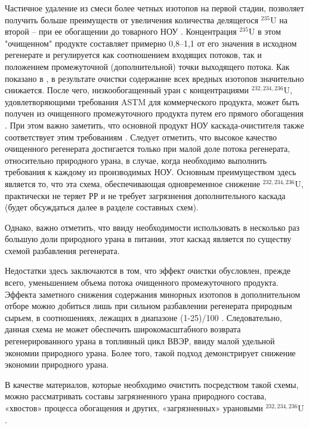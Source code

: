 Частичное удаление из смеси более четных изотопов на первой стадии, позволяет получить больше преимуществ от увеличения количества делящегося $^{235}$U на второй -- при ее обогащении до товарного НОУ \cite{palkinSeparationUraniumIsotopes2010}.
Концентрация $^{235}$U в этом "очищенном" продукте составляет примерно 0,8--1,1 от его значения в исходном регенерате и регулируется как соотношением входящих потоков, так и положением промежуточной (дополнительной) точки выходящего потока.
Как показано в \cite{palkinSeparationUraniumIsotopes2010}, в результате очистки содержание всех вредных изотопов значительно снижается. После чего, низкообогащенный уран с концентрациями $^{232,234,236}$U, удовлетворяющими требования ASTM для коммерческого продукта, может быть получен из очищенного промежуточного продукта путем его прямого обогащения \cite{shopenSposobPolucheniyaRazbavitelya2008}.
При этом важно заметить, что основной продукт НОУ каскада-очистителя также соответствует этим требованиям \cite{palkinSeparationUraniumIsotopes2010}. Следует отметить, что высокое качество очищенного регенерата достигается только при малой доле потока регенерата, относительно природного урана, в случае, когда необходимо выполнить требования к каждому из производимых НОУ.
Основным преимуществом здесь является то, что эта схема, обеспечивающая одновременное снижение $^{232,234,236}$U, практически не теряет РР и не требует загрязнения дополнительного каскада (будет обсуждаться далее в разделе составных схем).

Однако, важно отметить, что ввиду необходимости использовать в несколько раз большую доли природного урана в питании, этот каскад является по существу схемой разбавления регенерата.

Недостатки здесь заключаются в том, что эффект очистки обусловлен, прежде всего, уменьшением объема потока очищенного промежуточного продукта. Эффекта заметного снижения содержания минорных изотопов в дополнительном отборе можно добиться лишь при сильном разбавлении регенерата природным сырьем, в соотношениях, лежащих в диапазоне (1-25)/100 \cite{palkinSeparationUraniumIsotopes2010, smirnovKaskadnyeShemyZadachah2012}.
Следовательно, данная схема не может обеспечить широкомасштабного возврата регенерированного урана в топливный цикл ВВЭР, ввиду малой удельной экономии природного урана.
Более того, такой подход демонстрирует снижение экономии природного урана.

В качестве материалов, которые необходимо очистить посредством такой схемы, можно рассматривать составы загрязненного урана природного состава, «хвостов» процесса обогащения и других, «загрязненных» урановыми $^{232,234,236}$U \cite{palkinSeparationUraniumIsotopes2010}. 

